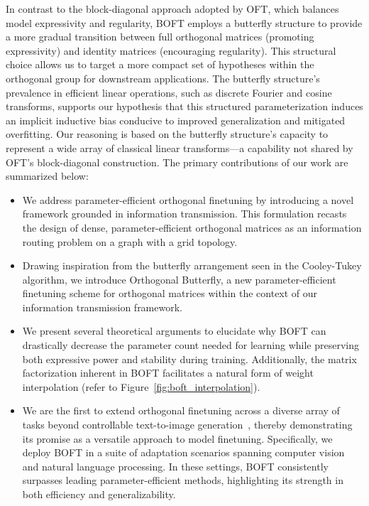 In contrast to the block-diagonal approach adopted by OFT, which balances model expressivity and regularity, BOFT employs a butterfly structure to provide a more gradual transition between full orthogonal matrices (promoting expressivity) and identity matrices (encouraging regularity). This structural choice allows us to target a more compact set of hypotheses within the orthogonal group for downstream applications. The butterfly structure’s prevalence in efficient linear operations, such as discrete Fourier and cosine transforms, supports our hypothesis that this structured parameterization induces an implicit inductive bias conducive to improved generalization and mitigated overfitting. Our reasoning is based on the butterfly structure’s capacity to represent a wide array of classical linear transforms—a capability not shared by OFT’s block-diagonal construction. The primary contributions of our work are summarized below:

\begin{itemize}[leftmargin=*,nosep]
    \item We address parameter-efficient orthogonal finetuning by introducing a novel framework grounded in information transmission. This formulation recasts the design of dense, parameter-efficient orthogonal matrices as an information routing problem on a graph with a grid topology.
    \item Drawing inspiration from the butterfly arrangement seen in the Cooley-Tukey algorithm, we introduce Orthogonal Butterfly, a new parameter-efficient finetuning scheme for orthogonal matrices within the context of our information transmission framework.
    \item We present several theoretical arguments to elucidate why BOFT can drastically decrease the parameter count needed for learning while preserving both expressive power and stability during training. Additionally, the matrix factorization inherent in BOFT facilitates a natural form of weight interpolation (refer to Figure~\ref{fig:boft_interpolation}).
    \item We are the first to extend orthogonal finetuning across a diverse array of tasks beyond controllable text-to-image generation~\cite{qiu2023controlling}, thereby demonstrating its promise as a versatile approach to model finetuning. Specifically, we deploy BOFT in a suite of adaptation scenarios spanning computer vision and natural language processing. In these settings, BOFT consistently surpasses leading parameter-efficient methods, highlighting its strength in both efficiency and generalizability.
\end{itemize}

